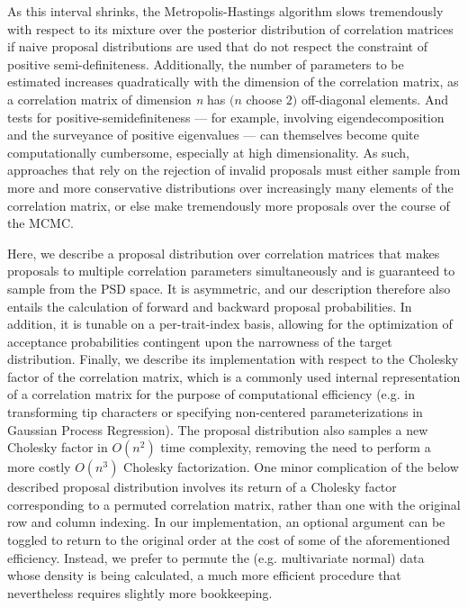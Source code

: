 As this interval shrinks, the Metropolis-Hastings algorithm slows tremendously with respect to its mixture over the posterior distribution of correlation matrices if naive proposal distributions are used that do not respect the constraint of positive semi-definiteness. Additionally, the number of parameters to be estimated increases quadratically with the dimension of the correlation matrix, as a correlation matrix of dimension \textit{n} has $(\textit{n}$ choose $2)$ off-diagonal elements. And tests for positive-semidefiniteness --- for example, involving eigendecomposition and the surveyance of positive eigenvalues --- can themselves become quite computationally cumbersome, especially at high dimensionality. As such, approaches that rely on the rejection of invalid proposals must either sample from more and more conservative distributions over increasingly many elements of the correlation matrix, or else make tremendously more proposals over the course of the MCMC.

Here, we describe a proposal distribution over correlation matrices that makes proposals to multiple correlation parameters simultaneously and is guaranteed to sample from the PSD space. It is asymmetric, and our description therefore also entails the calculation of forward and backward proposal probabilities. In addition, it is tunable on a per-trait-index basis, allowing for the optimization of acceptance probabilities contingent upon the narrowness of the target distribution. Finally, we describe its implementation with respect to the Cholesky factor of the correlation matrix, which is a commonly used internal representation of a correlation matrix for the purpose of computational efficiency (e.g. in transforming tip characters or specifying non-centered parameterizations in Gaussian Process Regression). The proposal distribution also samples a new Cholesky factor in $O(n^2)$ time complexity, removing the need to perform a more costly $O(n^3)$ Cholesky factorization. One minor complication of the below described proposal distribution involves its return of a Cholesky factor corresponding to a permuted correlation matrix, rather than one with the original row and column indexing. In our implementation, an optional argument can be toggled to return to the original order at the cost of some of the aforementioned efficiency. Instead, we prefer to permute the (e.g. multivariate normal) data whose density is being calculated, a much more efficient procedure that nevertheless requires slightly more bookkeeping.

